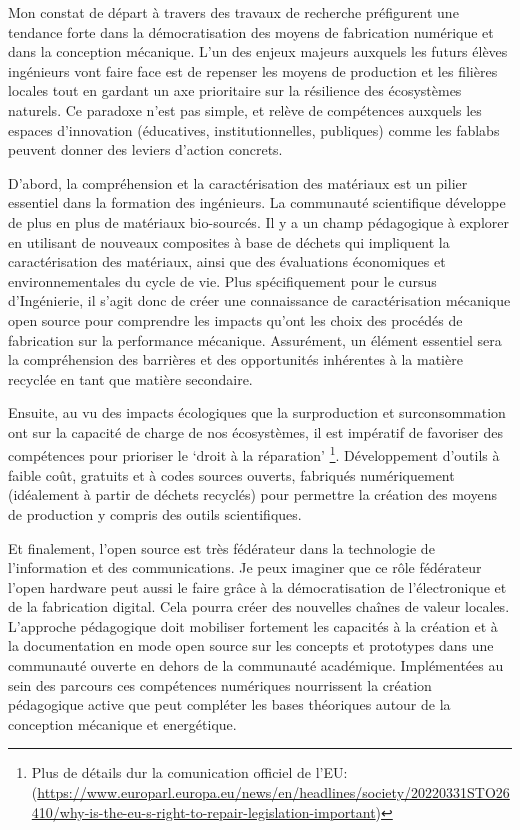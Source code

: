 \documentclass[
  12pt,
  oneside]{book}
\begin{document}
Mon constat de départ à travers des travaux de recherche préfigurent une tendance forte dans la démocratisation des moyens de fabrication numérique et dans la conception mécanique. L'un des enjeux majeurs auxquels les futurs élèves ingénieurs vont faire face est de repenser les moyens de production et les filières locales tout en gardant un axe prioritaire sur la résilience des écosystèmes naturels. Ce paradoxe n'est pas simple, et relève de compétences auxquels les espaces d'innovation (éducatives, institutionnelles, publiques) comme les fablabs peuvent donner des leviers d'action concrets.

D'abord, la compréhension et la caractérisation des matériaux est un pilier essentiel dans la formation des ingénieurs. La communauté scientifique développe de plus en plus de matériaux bio-sourcés. Il y a un champ pédagogique à explorer en utilisant de nouveaux composites à base de déchets qui impliquent la caractérisation des matériaux, ainsi que des évaluations économiques et environnementales du cycle de vie.
Plus spécifiquement pour le cursus d'Ingénierie, il s'agit donc de créer une connaissance de caractérisation mécanique open source pour comprendre les impacts qu'ont les choix des procédés de fabrication sur la performance mécanique. Assurément, un élément essentiel sera la compréhension des barrières et des opportunités inhérentes à la matière recyclée en tant que matière secondaire.

Ensuite, au vu des impacts écologiques que la surproduction et surconsommation ont sur la capacité de charge de nos écosystèmes, il est impératif de favoriser des compétences pour prioriser le `droit à la réparation' \footnote{Plus de détails dur la comunication officiel de l'EU: (\url{https://www.europarl.europa.eu/news/en/headlines/society/20220331STO26410/why-is-the-eu-s-right-to-repair-legislation-important})}. Développement d'outils à faible coût, gratuits et à codes sources ouverts, fabriqués numériquement (idéalement à partir de déchets recyclés) pour permettre la création des moyens de production y compris des outils scientifiques.

Et finalement, l'open source est très fédérateur dans la technologie de l'information et des communications. Je peux imaginer que ce rôle fédérateur l'open hardware peut aussi le faire grâce à la démocratisation de l'électronique et de la fabrication digital. Cela pourra créer des nouvelles chaînes de valeur locales. L'approche pédagogique doit mobiliser fortement les capacités à la création et à la documentation en mode open source sur les concepts et prototypes dans une communauté ouverte en dehors de la communauté académique. Implémentées au sein des parcours ces compétences numériques nourrissent la création pédagogique active que peut compléter les bases théoriques autour de la conception mécanique et energétique.
\end{document}
